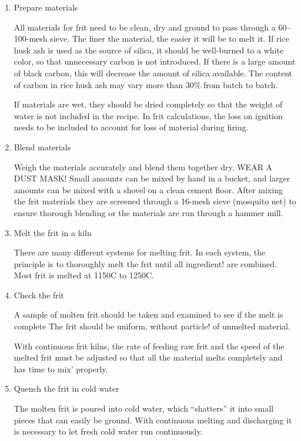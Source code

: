 \begin{enumerate}
\item Prepare materials

All materials for frit need to be clean, dry and ground to pass through a 
60--100-mesh sieve. The finer the material, the easier it will be to melt it. 
If rice husk ash is used as the source of silica, it should be well-burned to a 
white color, so that unnecessary carbon is not introduced. If there is a large 
amount of black carbon, this will decrease the amount of silica available. The 
content of carbon in rice husk ash may vary more than 30\% from batch to batch.

If materials are wet, they should be dried completely so that the weight of 
water is not included in the recipe. In frit calculations, the loss on ignition 
needs to be included to account for loss of material during firing.

\item Blend materials

Weigh the materials accurately and blend them together dry. WEAR A DUST MASK! 
Small amounts can be mixed by hand in a bucket, and larger amounts can be mixed 
with a shovel on a clean cement floor. After mixing the frit materials they are 
screened through a 16-mesh sieve (mosquito net) to ensure thorough blending or 
the materials are run through a hammer mill.

\item Melt the frit in a kiln

There are many different systems for melting frit. In each system, the 
principle is to thoroughly melt the frit until all ingredient! are combined. 
Most frit is melted at 1150\degree C to 1250\degree C.

\item Check the frit

A sample of molten frit should be taken and examined to see if the melt is 
complete The frit should be uniform, without particle! of unmelted material.

With continuous frit kilns, the rate of feeding raw frit and the speed of the 
melted frit must be adjusted so that all the material melts completely and has 
time to mix' properly.

\item Quench the frit in cold water

The molten frit is poured into cold water, which ``shatters'' it into small 
pieces that can easily be ground. With continuous melting and discharging it is 
necessary to let fresh cold water run continuously.


\end{enumerate}
